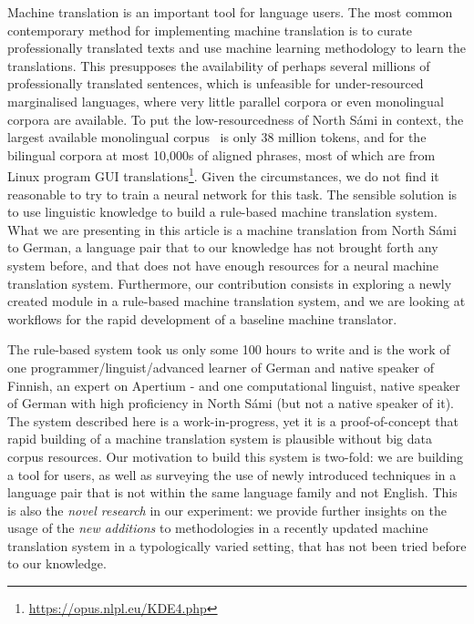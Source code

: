 \documentclass{flammie}
\begin{document}
Machine translation is an important tool for language users.  The most common
contemporary method for implementing machine translation is to curate
professionally translated texts and use machine learning methodology to learn
the translations.  This presupposes the availability of perhaps several millions
of professionally translated sentences, which is unfeasible for under-resourced
marginalised languages, where very little parallel corpora or even monolingual
corpora are available.  To put the low-resourcedness of North Sámi in context,
the largest available monolingual corpus~\cite{sikor_06.11.2018} is only 38
million tokens, and for the bilingual corpora at most 10,000s of aligned
phrases, most of which are from Linux program GUI
translations\footnote{\url{https://opus.nlpl.eu/KDE4.php}}.  Given the
circumstances, we do not find it reasonable to try to train a neural network for
this task.  The sensible solution is to use linguistic knowledge to build a
rule-based machine translation system.  What we are presenting in this article
is a machine translation from North Sámi to German, a language pair that to our
knowledge has not brought forth any system before, and that does not have enough
resources for a neural machine translation system.  Furthermore, our
contribution consists in exploring a newly created module in a rule-based
machine translation system, and we are looking at workflows for the rapid
development of a baseline machine translator.

The rule-based system took us only some 100 hours to write and is the work of
one programmer/linguist/advanced learner of German and native speaker of
Finnish, an expert on Apertium - and one computational linguist, native speaker
of German with high proficiency in North Sámi (but not a native speaker of it).
The system described here is a work-in-progress, yet it is a proof-of-concept
that rapid building of a machine translation system is plausible without big
data corpus resources.  Our motivation to build this system is two-fold: we are
building a tool for users, as well as surveying the use of newly introduced
techniques in a language pair that is not within the same language family and
not English.  This is also the \textit{novel research} in our experiment: we
provide further insights on the usage of the \textit{new additions} to
methodologies in a recently updated machine translation system in a
typologically varied setting, that has not been tried before to our knowledge.
\end{document}
